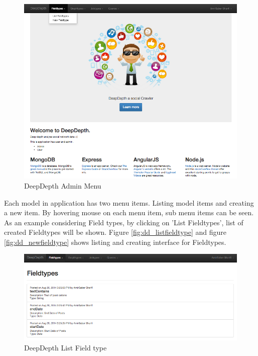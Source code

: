 \documentclass[a4paper,11pt]{report}
\begin{document}
\begin{figure}[H!]
\begin{center}
\includegraphics[scale=0.5]{dd_afterlogin.png}
\end{center}
\caption{DeepDepth Admin Menu}
\label{fig:dd_afterlogin}
\end{figure}

Each model in application has two menu items. Listing model items and creating a new item. By hovering mouse on each menu item, sub menu items can be seen. As an example considering Field types, by clicking on 'List Fieldtypes', list of created Fieldtypes will be shown. Figure \ref{fig:dd_listfieldtype} and figure \ref{fig:dd_newfieldtype} shows listing and creating interface for Fieldtypes.


\begin{figure}[H!]
\begin{center}
\includegraphics[scale=0.5]{dd_listfieldtypes.png}
\end{center}
\caption{DeepDepth List Field type}
\label{fig:dd_listfieldtypes}
\end{figure}
\end{document}
